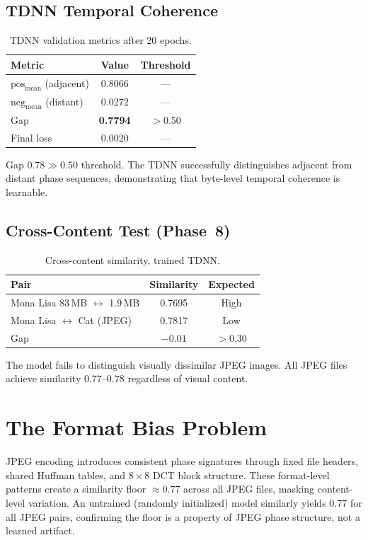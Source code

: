 \documentclass[10pt,twocolumn]{article}
\begin{document}
\subsection{TDNN Temporal Coherence}
\begin{table}[h]
\caption{TDNN validation metrics after 20 epochs.}
\label{tab:tdnn}
\begin{tabular}{lcc}
\toprule
Metric & Value & Threshold \\
\midrule
$\text{pos}_{\text{mean}}$ (adjacent) & 0.8066 & --- \\
$\text{neg}_{\text{mean}}$ (distant)  & 0.0272 & --- \\
Gap & \textbf{0.7794} & $>$0.50 \\
Final loss & 0.0020 & --- \\
\bottomrule
\end{tabular}
\end{table}
Gap $0.78 \gg 0.50$ threshold. The TDNN successfully distinguishes adjacent
from distant phase sequences, demonstrating that byte-level temporal
coherence is learnable.

\subsection{Cross-Content Test (Phase~8)}\label{sec:bias}
\begin{table}[h]
\caption{Cross-content similarity, trained TDNN.}
\label{tab:crosscontent}
\begin{tabular}{lcc}
\toprule
Pair & Similarity & Expected \\
\midrule
Mona Lisa 83\,MB $\leftrightarrow$ 1.9\,MB & 0.7695 & High \\
Mona Lisa $\leftrightarrow$ Cat (JPEG) & 0.7817 & Low \\
Gap & $-0.01$ & $>$0.30 \\
\bottomrule
\end{tabular}
\end{table}
The model fails to distinguish visually dissimilar JPEG images. All JPEG
files achieve similarity $0.77$--$0.78$ regardless of visual content.

\section{The Format Bias Problem}\label{sec:format}
JPEG encoding introduces consistent phase signatures through fixed file
headers, shared Huffman tables, and $8\times8$ DCT block structure. These
format-level patterns create a similarity floor $\approx0.77$ across all
JPEG files, masking content-level variation. An untrained (randomly
initia\-lized) model similarly yields $0.77$ for all JPEG pairs, confirming
the floor is a property of JPEG phase structure, not a learned artifact.
\end{document}

